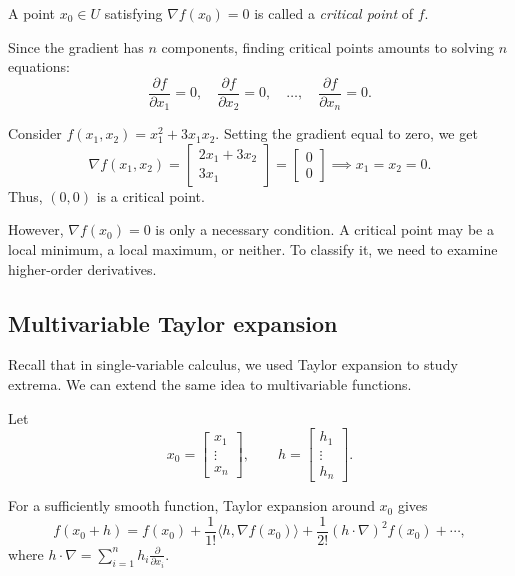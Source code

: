 \begin{definition}
	A point $x_0\in U$ satisfying $\nabla f(x_0)=0$ is called a \emph{critical point} of $f$.
\end{definition}

Since the gradient has $n$ components, finding critical points amounts to solving $n$ equations:
\[
	\frac{\partial f}{\partial x_1}=0,\quad
	\frac{\partial f}{\partial x_2}=0,\quad\ldots,\quad
	\frac{\partial f}{\partial x_n}=0.
\]

\begin{example}
	Consider $f(x_1,x_2)=x_1^2+3x_1x_2$. Setting the gradient equal to zero, we get
	\[
		\nabla f(x_1,x_2)=
		\begin{bmatrix}
			2x_1+3x_2 \\
			3x_1
		\end{bmatrix}
		=
		\begin{bmatrix}0\\0\end{bmatrix}
		\implies x_1=x_2=0.
	\]
	Thus, $(0,0)$ is a critical point.
\end{example}

However, $\nabla f(x_0)=0$ is only a necessary condition. A critical point may be a local minimum, a local maximum, or neither. To classify it, we need to examine higher-order derivatives.

\subsection{Multivariable Taylor expansion}

Recall that in single-variable calculus, we used Taylor expansion to study extrema. We can extend the same idea to multivariable functions.

Let
\[
	x_0=\begin{bmatrix}x_1\\ \vdots\\ x_n\end{bmatrix},
	\qquad
	h=\begin{bmatrix}h_1\\ \vdots\\ h_n\end{bmatrix}.
\]

For a sufficiently smooth function, Taylor expansion around $x_0$ gives
\begin{equation}
	f(x_0+h)=f(x_0)+\frac{1}{1!}\langle h,\nabla f(x_0)\rangle+\frac{1}{2!}(h\cdot\nabla)^2f(x_0)+\cdots,
	\label{eq:multivariable-taylor-expansion}
\end{equation}
where $h\cdot\nabla=\sum_{i=1}^n h_i\frac{\partial}{\partial x_i}$.

